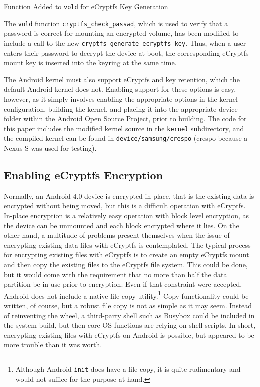 \begin{table}[!htb]
 
\caption{Function Added to \texttt{vold} for eCryptfs Key Generation}
\label{tab:generate-key}
\end{table}

The \texttt{vold} function \texttt{cryptfs\_check\_passwd}, which is used to verify that a password is correct for mounting an
encrypted volume, has been modified to include a call to the new \texttt{cryptfs\_generate\_ecryptfs\_key}. Thus, when a user enters
their password to decrypt the device at boot, the corresponding eCryptfs mount key is inserted into the keyring at the same time.

The Android kernel must also support eCryptfs and key retention, which the default Android kernel does not. Enabling support for
these options is easy, however, as it simply involves enabling the appropriate options in the kernel configuration, building the
kernel, and placing it into the appropriate device folder within the Android Open Source Project, prior to building. The code for
this paper includes the modified kernel source in the \texttt{kernel} subdirectory, and the compiled kernel can be found in
\texttt{device/samsung/crespo} (crespo because a Nexus S was used for testing).

\subsection{Enabling eCryptfs Encryption} Normally, an Android 4.0 device is encrypted in-place, that is the existing data is
encrypted without being moved, but this is a difficult operation with eCryptfs. In-place encryption is a relatively easy operation
with block level encryption, as the device can be unmounted and each block encrypted where it lies. On the other hand, a multitude
of problems present themselves when the issue of encrypting existing data files with eCryptfs is contemplated.  The typical process
for encrypting existing files with eCryptfs is to create an empty eCryptfs mount and then copy the existing files to the eCryptfs
file system.  This could be done, but it would come with the requirement that no more than half the data partition be in use prior to
encryption. Even if that constraint were accepted, Android does not include a native file copy utility.\footnote{Although Android
\texttt{init} does have a file copy, it is quite rudimentary and would not suffice for the purpose at hand.} Copy functionality
could be written, of course, but a robust file copy is not as simple as it may seem. Instead of reinventing the wheel, a third-party
shell such as Busybox could be included in the system build, but then core OS functions are relying on shell scripts. In short,
encrypting existing files with eCryptfs on Android is possible, but appeared to be more trouble than it was worth.


